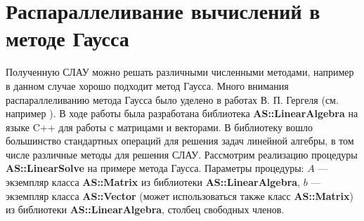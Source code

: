 \documentclass{spisok-article}
\begin{document}

\section{Распараллеливание вычислений в методе Гаусса}
Полученную СЛАУ можно решать различными численными методами, например в данном случае хорошо подходит метод Гаусса. Много внимания распараллеливанию метода Гаусса было уделено в работах В. П. Гергеля (см. например \cite{Gergel}). В ходе работы была разработана библиотека \textbf{AS::LinearAlgebra} на языке C++ для работы с матрицами и векторами. В библиотеку вошло большинство стандартных операций для решения задач линейной алгебры, в том числе различные методы для решения СЛАУ. Рассмотрим реализацию процедуры \textbf{AS::LinearSolve} на примере метода Гаусса. Параметры процедуры: $A$ --- экземпляр класса \textbf{AS::Matrix} из библиотеки \textbf{AS::LinearAlgebra}, $b$ --- экземпляр класса \textbf{AS::Vector} (может использоваться также класс \textbf{AS::Matrix}) из библиотеки \textbf{AS::LinearAlgebra}, столбец свободных членов.
\end{document}
